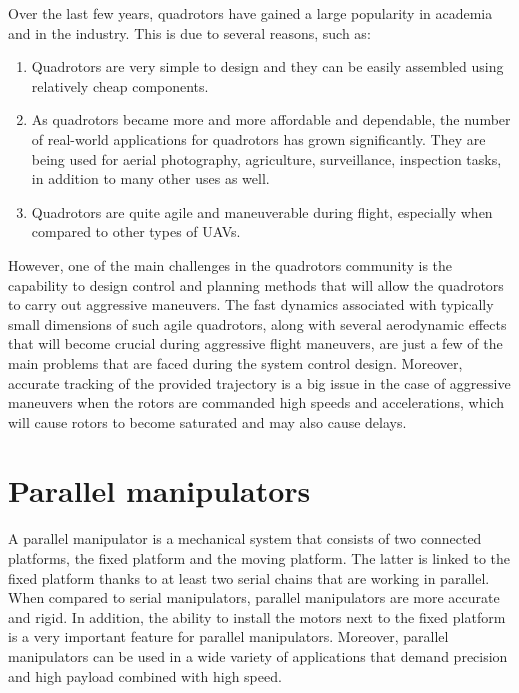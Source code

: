 \documentclass{thesisreport}
\begin{document}
Over the last few years, quadrotors have gained a large popularity in academia and in the industry. This is due to several reasons, such as: 

\begin{enumerate}

    \item Quadrotors are very simple to design and they can be easily assembled using relatively cheap components.  
    \item As quadrotors became more and more affordable and dependable, the number of real-world applications for quadrotors  has grown significantly. They are being used for aerial photography, agriculture, surveillance, inspection tasks, in addition to many other uses as well. 
    \item Quadrotors are quite agile and maneuverable during flight, especially when compared to other types of UAVs.
    
\end{enumerate}

However, one of the main challenges in the quadrotors community is the capability to design control and planning methods that will allow the quadrotors to carry out aggressive maneuvers.  The fast dynamics associated with typically small dimensions of such agile quadrotors, along with several aerodynamic effects that will become crucial during aggressive flight maneuvers, are just a few of the main problems that are faced during the system control design. Moreover, accurate tracking of the provided trajectory is a big issue in the case of aggressive maneuvers when the rotors are commanded high speeds and accelerations, which will cause rotors to become saturated and may also cause delays.


 \section*{Parallel manipulators}

A parallel manipulator is a mechanical system that consists of two connected platforms, the fixed platform and the moving platform. The latter is linked to the fixed platform thanks to at least two serial chains that are working in parallel. When compared to serial manipulators, parallel manipulators are more accurate and rigid. In addition, the ability to install the motors next to the fixed platform is a very important feature for parallel manipulators. Moreover, parallel manipulators can be used in a wide variety of applications that demand precision and high payload combined with high speed.\cite{Parallel_Manipulators}
\end{document}
